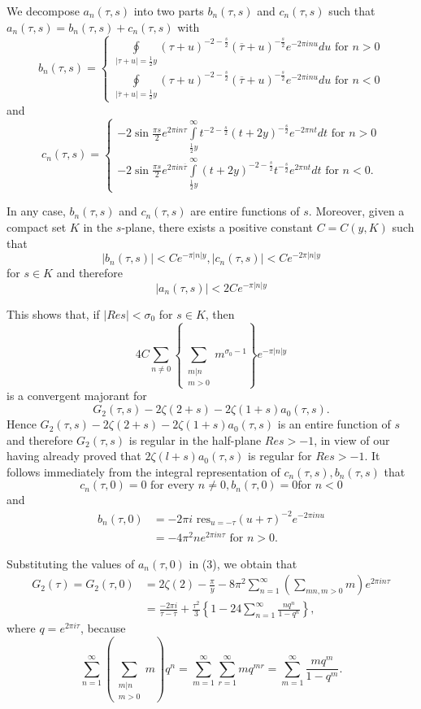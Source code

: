 We decompose $a_n(\tau, s)$ into two parts $b_n(\tau, s)$ and
$c_n(\tau, s)$ such that $a_n(\tau, s)=b_n(\tau, s)+c_n(\tau, s)$ with 
$$
b_n(\tau, s) = \begin{cases}
\oint\limits_{|\tau+u|=\frac{1}{2}y} (\tau+u)^{-2-\frac{s}{2}}
(\overline{\tau}+u)^{-\frac{s}{2}} e^{-2\pi i nu} du \text{ for } n
>0\\
\oint\limits_{|\overline{\tau}+u|=\frac{1}{2}y}
(\tau+u)^{-2-\frac{s}{2}} (\overline{\tau}+u)^{-\frac{s}{2}} e^{-2 \pi
i nu} du \text{ for } n < 0
\end{cases}
$$
and
$$
c_n(\tau, s)=
\begin{cases}
-2 \sin \frac{\pi s}{2} e^{2\pi in\tau}
\int\limits^{\infty}_{\frac{1}{2}y} t^{-2-\frac{s}{2}}
(t+2y)^{-\frac{s}{2}} e^{-2 \pi n t} dt \text{ for } n > 0\\
-2 \sin \frac{\pi s}{2} e^{2\pi i n \overline{\tau}}
\int\limits^{\infty}_{\frac{1}{2}y} (t+2y)^{-2-\frac{s}{2}}
t^{-\frac{s}{2}} e^{2\pi n t} dt \text{ for } n < 0.
\end{cases}
$$

In \pageoriginale any case, $b_n(\tau, s)$ and $c_n(\tau, s)$ are
entire functions of $s$. Moreover, given a compact set $K$ in the
$s$-plane, there exists a positive constant $C=C(y,K)$ such that 
$$
|b_n (\tau,s)|< C e^{-\pi |n|y}, |c_n(\tau, s)| < C e^{-2\pi |n|y}
$$
for $s\in K$ and therefore 
$$
|a_n (\tau, s)| < 2 C e^{-\pi|n|y}
$$

This shows that, if $|Re s |< \sigma_0$ for $s\in K$, then 
$$
4C \sum_{n \neq 0} \left\{ \sum_{\substack{m|n\\m>0}}
m^{\sigma_0-1}\right\}e^{-\pi |n|y}
$$
is a convergent majorant for 
$$
G_2(\tau,s) -2 \zeta(2+s) - 2\zeta(1+s) a_0(\tau,s).
$$
Hence $G_2(\tau,s)-2\zeta(2+s)-2\zeta(1+s)a_0(\tau,s)$ is an entire
function of $s$ and therefore $G_2(\tau, s)$ is regular in the
half-plane $Re s >-1$, in view of our having already proved that
$2\zeta(l+s)a_0(\tau, s)$ is regular for $Re s>-1 $. It follows
immediately from the integral representation of $c_n(\tau,s),
b_n(\tau,s)$ that 
$$
c_n(\tau, 0)=0 \text{ for every } n \neq 0, b_n (\tau,0) = 0 \text{
  for }n < 0
$$
and 
\begin{align*}
b_n(\tau, 0) & = - 2\pi i \text{ res}_{u=-\tau} 
(u+\tau)^{-2} e^{-2\pi i nu}\\
& = -4\pi^2 n e^{2\pi i n \tau} \text{ for } n > 0.
\end{align*}

Substituting \pageoriginale the values of $a_n(\tau,0)$ in (3), we
obtain that
\begin{align*}
G_2 (\tau) = G_2 (\tau, 0) & = 2\zeta(2) - \frac{\pi}{y} - 8\pi^2
\sum^{\infty}_{n=1} \left(\sum_{m n,m>0} m\right) e^{2\pi i n \tau}\\
& = \frac{-2\pi i }{\tau -\overline{\tau}} + \frac{\tau^2}{3} \left\{
1-24 \sum^{\infty}_{n=1} \frac{nq^n}{1-q^n}\right\},
\end{align*}
where $q=e^{2\pi i \tau}$, because
$$ 
\sum^{\infty}_{n=1} \left(\sum_{\substack{m|n\\m>0}} m \right)q^n  =
\sum^{\infty}_{m=1} \sum^{\infty}_{r=1} m q^{mr} = \sum^{\infty}_{m=1}
\frac{mq^m}{1-q^m}. 
$$

